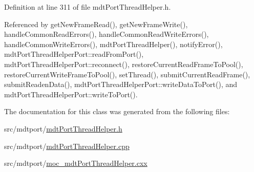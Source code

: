 Definition at line 311 of file mdt\-Port\-Thread\-Helper.\-h.



Referenced by get\-New\-Frame\-Read(), get\-New\-Frame\-Write(), handle\-Common\-Read\-Errors(), handle\-Common\-Read\-Write\-Errors(), handle\-Common\-Write\-Errors(), mdt\-Port\-Thread\-Helper(), notify\-Error(), mdt\-Port\-Thread\-Helper\-Port\-::read\-From\-Port(), mdt\-Port\-Thread\-Helper\-Port\-::reconnect(), restore\-Current\-Read\-Frame\-To\-Pool(), restore\-Current\-Write\-Frame\-To\-Pool(), set\-Thread(), submit\-Current\-Read\-Frame(), submit\-Readen\-Data(), mdt\-Port\-Thread\-Helper\-Port\-::write\-Data\-To\-Port(), and mdt\-Port\-Thread\-Helper\-Port\-::write\-To\-Port().



The documentation for this class was generated from the following files\-:\begin{DoxyCompactItemize}
\item 
src/mdtport/\hyperlink{mdt_port_thread_helper_8h}{mdt\-Port\-Thread\-Helper.\-h}\item 
src/mdtport/\hyperlink{mdt_port_thread_helper_8cpp}{mdt\-Port\-Thread\-Helper.\-cpp}\item 
src/mdtport/\hyperlink{moc__mdt_port_thread_helper_8cxx}{moc\-\_\-mdt\-Port\-Thread\-Helper.\-cxx}\end{DoxyCompactItemize}
